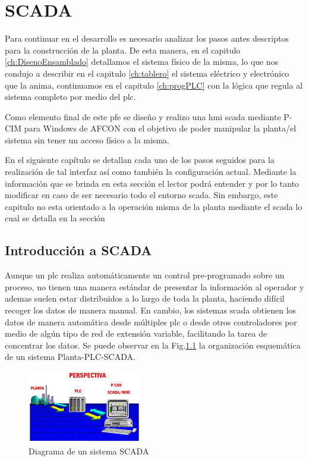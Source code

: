 \chapter{SCADA}
\label{ch:scada}
Para continuar en el desarrollo es necesario analizar los pasos antes descriptos 
para la construcción de la planta. De esta manera, en el capitulo 
\ref{ch:DisenoEnsamblado} detallamos el sistema físico de la misma, lo que nos 
condujo a describir en el capitulo \ref{ch:tablero} el sistema eléctrico y 
electrónico que la anima, continuamos en el capitulo \ref{ch:progPLC} con la 
lógica que regula al sistema completo por medio del \gls{plc}. 

Como elemento final de este \gls{pfe} se diseño y realizo una \gls{hmi} 
\gls{scada} mediante P-CIM para Windows de AFCON con el objetivo de poder 
manipular la planta/el sistema sin tener un acceso físico a la misma.

En el siguiente capítulo se detallan cada uno de los pasos seguidos para la 
realización de tal interfaz así como también la configuración actual. Mediante 
la información que se brinda en esta sección el lector podrá entender y por lo 
tanto modificar en caso de ser necesario todo el entorno \gls{scada}. Sin 
embargo, este capitulo no esta orientado a la operación misma de la planta 
mediante el \gls{scada} lo cual se detalla en la sección 

\section{Introducción a SCADA}
\label{sec:IntroScada}
Aunque un \gls{plc} realiza automáticamente un control pre-programado sobre un 
proceso, no tienen una manera estándar de presentar la información al operador y 
ademas suelen estar distribuidos a lo largo de toda la planta, haciendo difícil 
recoger los datos de manera manual.%
En cambio, los sistemas \gls{scada} obtienen los datos de manera 
automática desde múltiples \gls{plc} o desde otros controladores por medio de 
algún tipo de red de extensión variable, facilitando la tarea de concentrar 
los datos. Se puede observar en la Fig.\ref{fig:perspectivaSCADA} la 
organización esquemática de un sistema Planta-PLC-SCADA.
\begin{figure}[ht!]
	\centering
	\includegraphics[width=0.445\textwidth]
	{Cap5-SCADA/images/perspectiva.jpeg}
	\caption{Diagrama de un sistema SCADA}
	\label{fig:perspectivaSCADA}
\end{figure}

